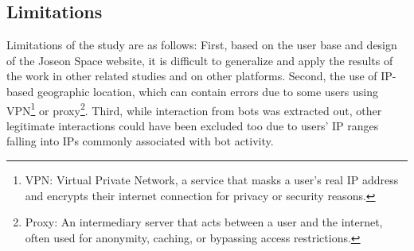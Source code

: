 \documentclass[conference]{IEEEtran}
\begin{document}
\subsection{Limitations}

Limitations of the study are as follows: First, based on the user base and design of the Joseon Space website, it is difficult to generalize and apply the results of the work in other related studies and on other platforms. Second, the use of IP-based geographic location, which can contain errors due to some users using VPN\footnote{VPN: Virtual Private Network, a service that masks a user's real IP address and encrypts their internet connection for privacy or security reasons.} or proxy\footnote{Proxy: An intermediary server that acts between a user and the internet, often used for anonymity, caching, or bypassing access restrictions.}. Third, while interaction from bots was extracted out, other legitimate interactions could have been excluded too due to users' IP ranges falling into IPs commonly associated with bot activity.
\end{document}
